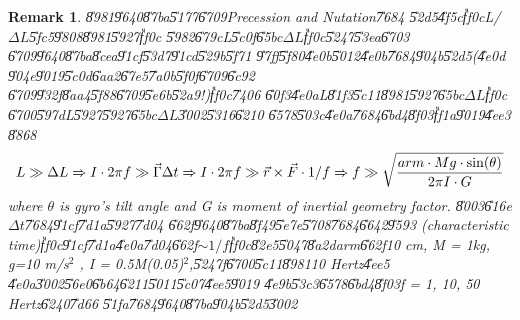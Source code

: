 \documentclass[12pt,a4paper]{article}
\newtheorem{remark}[theorem]{Remark}
\begin{document}
\begin{remark}
\U{8981}\U{9640}\U{87ba}\U{5177}\U{6709}Precession and Nutation\U{7684}%
\U{52d5}\U{4f5c}\U{ff0c}L/$\Delta L$\U{5fc5}\U{9808}\U{8981}\U{5927}\U{ff0c}%
\U{5982}\U{679c}L\U{5c0f}\U{65bc}$\Delta L$\U{ff0c}\U{5247}\U{53ea}\U{6703}%
\U{6709}\U{9640}\U{87ba}\U{8cea}\U{91cf}\U{53d7}\U{91cd}\U{529b}\U{5f71}%
\U{97ff}\U{5f80}\U{4e0b}\U{5012}\U{4e0b}\U{7684}\U{904b}\U{52d5}(\U{4e0d}%
\U{904e}\U{9019}\U{5c0d}\U{6aa2}\U{67e5}\U{7a0b}\U{5f0f}\U{6709}\U{6c92}%
\U{6709}\U{932f}\U{8aa4}\U{5f88}\U{6709}\U{5e6b}\U{52a9}!)\U{ff0c}\U{7406}%
\U{60f3}\U{4e0a}L\U{81f3}\U{5c11}\U{8981}\U{5927}\U{65bc}$\Delta L$\U{ff0c}%
\U{6700}\U{597d}L\U{5927}\U{5927}\U{65bc}$\Delta L$\U{3002}\U{5316}\U{6210}%
\U{6578}\U{503c}\U{4e0a}\U{7684}\U{6bd4}\U{8f03}\U{ff1a}\U{9019}\U{4ee3}%
\U{8868}%
\begin{equation}
L\gg \Delta L\Rightarrow I\cdot 2\pi f\gg \vec{\Gamma}\Delta t\Rightarrow
I\cdot 2\pi f\gg \vec{r}\times \vec{F}\cdot 1/f\Rightarrow f\gg \sqrt{\frac{%
arm\cdot Mg\cdot \sin (\theta )}{2\pi I\cdot G}}
\end{equation}%
where $\theta $ is gyro's tilt angle and G is moment of inertial geometry
factor. \U{8003}\U{616e}$\Delta t$\U{7684}\U{91cf}\U{7d1a}\U{5927}\U{7d04}%
\U{662f}\U{9640}\U{87ba}\U{8f49}\U{5e7e}\U{5708}\U{7684}\U{6642}\U{9593}%
(characteristic time)\U{ff0c}\U{91cf}\U{7d1a}\U{4e0a}\U{7d04}\U{662f}$\sim
1/f$\U{ff0c}\U{82e5}\U{5047}\U{8a2d}arm\U{662f}10 cm, M = 1kg, g=10 m/s$^{2}$%
, I = 0.5M(0.05)$^{2}$,\U{5247}f\U{6700}\U{5c11}\U{8981}10 Hertz\U{4ee5}%
\U{4e0a}\U{3002}\U{56e0}\U{6b64}\U{6211}\U{5011}\U{5c07}\U{4ee5}\U{9019}%
\U{4e9b}\U{53c3}\U{6578}\U{6bd4}\U{8f03}f = 1, 10, 50 Hertz\U{6240}\U{7d66}%
\U{51fa}\U{7684}\U{9640}\U{87ba}\U{904b}\U{52d5}\U{3002}
\end{remark}
\end{document}
